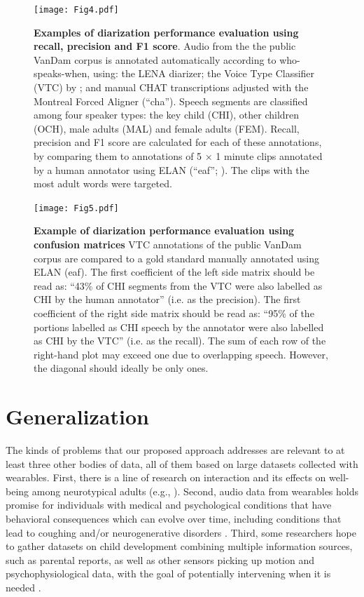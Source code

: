 \documentclass[smallextended]{svjour3}       %
\begin{document}
\begin{figure}[htb]

\centering
\texttt{[image: Fig4.pdf]}

\caption{\label{fig:precision}\textbf{Examples of diarization performance evaluation using recall, precision and F1 score}. Audio from the the public VanDam corpus \citep{vandam-day} is annotated automatically according to who-speaks-when, using: the LENA diarizer; the Voice Type Classifier (VTC) by \citet{lavechin2020opensource}; and manual CHAT transcriptions \citep{MacWhinney2000} adjusted with the Montreal Forced Aligner \citep{mfa} (``cha''). Speech segments are classified among four speaker types: the key child (CHI), other children (OCH), male adults (MAL) and female adults (FEM). Recall, precision and F1 score are calculated for each of these annotations, by comparing them to annotations of 5 $\times$ 1 minute clips annotated by a human annotator using ELAN (``eaf''; \citealt{wittenburg2006elan}). The clips with the most adult words were targeted.
}

\end{figure}


\begin{figure}[htb]

\centering
\texttt{[image: Fig5.pdf]}

\caption{\label{fig:confusion}\textbf{Example of diarization performance evaluation using confusion matrices}
VTC annotations of the public VanDam corpus \citep{vandam-day} are compared to a gold standard manually annotated using ELAN (eaf). The first coefficient of the left side matrix should be read as: ``43\% of CHI segments from the VTC were also labelled as CHI by the human annotator'' (i.e. as the precision). The first coefficient of the right side matrix should be read as: ``95\% of the portions labelled as CHI speech by the annotator were also labelled as CHI by the VTC'' (i.e. as the recall). The sum of each row of the right-hand plot may exceed one due to overlapping speech. However, the diagonal should ideally be only ones.
}

\end{figure}


\section{Generalization}

The kinds of problems that our proposed approach addresses are relevant to at least three other bodies of data, all of them based on large datasets collected with wearables. First, there is a line of research on interaction and its effects on well-being among neurotypical adults (e.g., \cite{ear1}). Second, audio data from wearables holds promise for individuals with medical and psychological conditions that have behavioral consequences which can evolve over time, including conditions that lead to coughing \citep{Wu2018} and/or neurogenerative disorders \citep{riad2020vocal}. Third, some researchers hope to gather datasets on child development combining multiple information sources, such as parental reports, as well as other sensors picking up motion and psychophysiological data, with the goal of potentially intervening when it is needed \citep{levin2021sensing}.
\end{document}
